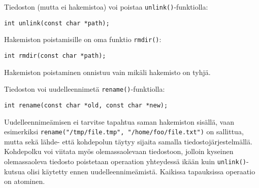 %
%

Tiedoston (mutta ei hakemistoa) voi poistaa \texttt{unlink()}-funktiolla:
\begin{verbatim}
int unlink(const char *path);
\end{verbatim}

Hakemiston poistamisille on oma funktio \texttt{rmdir()}:

\begin{verbatim}
int rmdir(const char *path);
\end{verbatim}
Hakemiston poistaminen onnistuu vain mikäli hakemisto on tyhjä.

Tiedoston voi uudelleennimetä \texttt{rename()}-funktiolla:
\begin{verbatim}
int rename(const char *old, const char *new);
\end{verbatim}

Uudelleennimeämisen ei tarvitse tapahtua saman hakemiston sisällä,
vaan esimerkiksi \texttt{rename("/tmp/file.tmp", "/home/foo/file.txt")} on sallittua,
mutta sekä lähde- että kohdepolun täytyy sijaita samalla tiedostojärjestelmällä.
Kohdepolku voi viitata myös olemassaolevaan tiedostoon,
jolloin kyseinen olemassaoleva tiedosto poistetaan operaation yhteydessä ikään kuin \texttt{unlink()}-kutsua olisi käytetty ennen uudelleennimeämistä.
Kaikissa tapauksissa operaatio on atominen.

